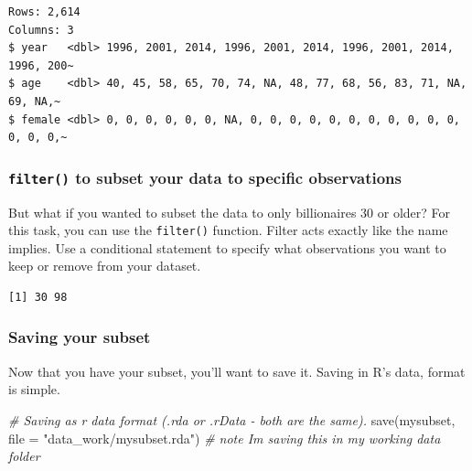 \documentclass[
]{book}
\newenvironment{Shaded}{\begin{snugshade}}{\end{snugshade}}
\newcommand{\AttributeTok}[1]{\textcolor[rgb]{0.77,0.63,0.00}{#1}}
\newcommand{\CommentTok}[1]{\textcolor[rgb]{0.56,0.35,0.01}{\textit{#1}}}
\newcommand{\DecValTok}[1]{\textcolor[rgb]{0.00,0.00,0.81}{#1}}
\newcommand{\FunctionTok}[1]{\textcolor[rgb]{0.00,0.00,0.00}{#1}}
\newcommand{\NormalTok}[1]{#1}
\newcommand{\OtherTok}[1]{\textcolor[rgb]{0.56,0.35,0.01}{#1}}
\newcommand{\SpecialCharTok}[1]{\textcolor[rgb]{0.00,0.00,0.00}{#1}}
\newcommand{\StringTok}[1]{\textcolor[rgb]{0.31,0.60,0.02}{#1}}
\begin{document}
\begin{verbatim}
Rows: 2,614
Columns: 3
$ year   <dbl> 1996, 2001, 2014, 1996, 2001, 2014, 1996, 2001, 2014, 1996, 200~
$ age    <dbl> 40, 45, 58, 65, 70, 74, NA, 48, 77, 68, 56, 83, 71, NA, 69, NA,~
$ female <dbl> 0, 0, 0, 0, 0, 0, NA, 0, 0, 0, 0, 0, 0, 0, 0, 0, 0, 0, 0, 0, 0,~
\end{verbatim}

\hypertarget{filter}{%
\subsubsection*{\texorpdfstring{\texttt{filter()} to subset your data to specific observations}{filter() to subset your data to specific observations}}\label{filter}}

But what if you wanted to subset the data to only billionaires 30 or older? For this task, you can use the \texttt{filter()} function. Filter acts exactly like the name implies. Use a conditional statement to specify what observations you want to keep or remove from your dataset.

\begin{Shaded}
\end{Shaded}

\begin{verbatim}
[1] 30 98
\end{verbatim}

\hypertarget{save}{%
\subsubsection*{Saving your subset}\label{save}}

Now that you have your subset, you'll want to save it. Saving in R's data, format is simple.

\begin{Shaded}
\begin{Highlighting}[]
\CommentTok{\# Saving as r data format (.rda or .rData {-} both are the same).}
\FunctionTok{save}\NormalTok{(mysubset, }\AttributeTok{file =} \StringTok{"data\_work/mysubset.rda"}\NormalTok{) }\CommentTok{\# note I\textquotesingle{}m saving this in my working data folder}
\end{Highlighting}
\end{Shaded}
\end{document}
